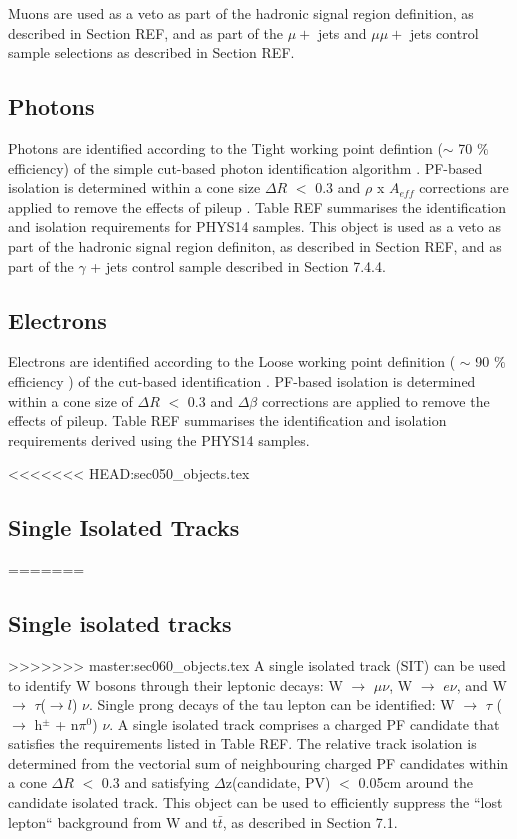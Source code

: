 Muons are used as a veto as part of the hadronic signal region definition, as described in Section REF, and as part of the $\mu +$ jets and $\mu\mu +$ jets control sample selections as described in Section REF.


\subsection{Photons}
\label{sec:photon-id}
Photons are identified according to the Tight working point defintion ($\sim$ 70 $\%$ efficiency) of the simple cut-based photon identification algorithm \cite{photon-id}. PF-based isolation is determined within a cone size $\Delta R$ $<$ 0.3 and $\rho$ x $A_{eff}$ corrections are applied to remove the effects of pileup \cite{pf-photon}. Table REF summarises the identification and isolation requirements for PHYS14 samples. 
This object is used as a veto as part of the hadronic signal region definiton, as described in Section REF, and as part of the $\gamma$ + jets control sample described in Section 7.4.4.


\subsection{Electrons}
\label{sec:electron-id}
Electrons are identified according to the Loose working point definition ( $\sim$ 90 $\%$ efficiency ) of the cut-based identification \cite{electron-id}. PF-based isolation \cite{pf-photon} is determined within a cone size of $\Delta R$ $<$ 0.3 and $\Delta \beta$ corrections are applied to remove the effects of pileup. Table REF summarises the identification and isolation requirements derived using the PHYS14 samples. 	



<<<<<<< HEAD:sec050_objects.tex
\subsection{Single Isolated Tracks}
\label{sec:SIT}
=======
\subsection{Single isolated tracks}
>>>>>>> master:sec060_objects.tex
A single isolated track (SIT) can be used to identify W bosons through their leptonic decays: W $\rightarrow$ $\mu \nu$, W $\rightarrow$ $e\nu$, and W $\rightarrow$ $\tau$($\rightarrow l$) $\nu$. Single prong decays of the tau lepton can be identified: W $\rightarrow$ $\tau$ ($\rightarrow$ h$^{\pm}$ + n$\pi^{0}$) $\nu$. A single isolated track comprises a charged PF candidate that satisfies the requirements listed in Table REF. The relative track isolation is determined from the vectorial sum of neighbouring charged PF candidates within a cone $\Delta R$ $<$ 0.3 and satisfying $\Delta$z(candidate, PV) $<$ 0.05cm around the candidate isolated track.
This object can be used to efficiently suppress the ``lost lepton`` background from W and t$\bar{t}$, as described in Section 7.1. 

